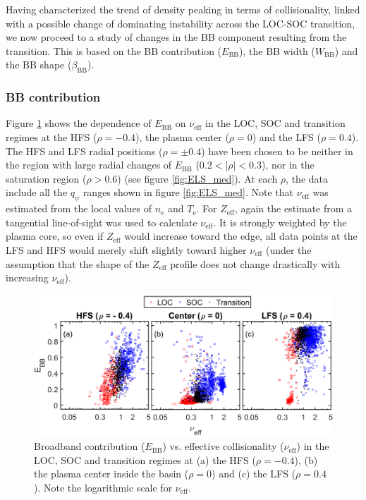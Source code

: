 Having characterized the trend of density peaking in terms of collisionality, linked with a possible change of dominating instability across the LOC-SOC transition, we now proceed to a study of changes in the BB component resulting from the transition. This is based on the BB contribution ($E_\mathrm{BB}$), the BB width ($W_\mathrm{BB}$) and the BB shape ($\beta_\mathrm{BB}$).


\subsubsection{BB contribution}

Figure \ref{fig:EBB_nu_OH} shows the dependence of $E_\mathrm{BB}$ on $\nu_\mathrm{eff}$ in the LOC, SOC and transition regimes at the HFS ($\rho = -0.4$), the plasma center ($\rho = 0$) and the LFS ($\rho = 0.4$). The HFS and LFS radial positions ($\rho = \pm 0.4$) have been chosen to be neither in the region with large radial changes of $E_\mathrm{BB}$ ($0.2 < |\rho| <0.3$), nor in the saturation region ($\rho > 0.6$) (see figure \ref{fig:ELS_med}). At each $\rho$, the data include all the $q_{\psi}$ ranges shown in figure \ref{fig:ELS_med}. Note that $\nu_\mathrm{eff}$ was estimated from the local values of $n_\mathrm{e}$ and $T_\mathrm{e}$. For $Z_\mathrm{eff}$, again the estimate from a tangential line-of-sight was used to calculate $\nu_\mathrm{eff}$. It is strongly weighted by the plasma core, so even if $Z_\mathrm{eff}$ would increase toward the edge, all data points at the LFS and HFS would merely shift slightly toward higher $\nu_\mathrm{eff}$ (under the assumption that the shape of the $Z_\mathrm{eff}$ profile does not change drastically with increasing $\nu_\mathrm{eff}$).


\begin{figure}[h]
\begin{centering}
\includegraphics[scale=0.7]{fig_EBB_nu_OH.eps}
\par\end{centering}
\caption{Broadband contribution ($E_\mathrm{BB}$) vs. effective collisionality ($\nu_\mathrm{eff}$) in the LOC, SOC and transition regimes at (a) the HFS ($\rho = -0.4$), (b) the plasma center inside the basin ($\rho = 0$) and (c) the LFS ($\rho = 0.4$). Note the logarithmic scale for $\nu_\mathrm{eff}$.}
\label{fig:EBB_nu_OH}
\end{figure}

